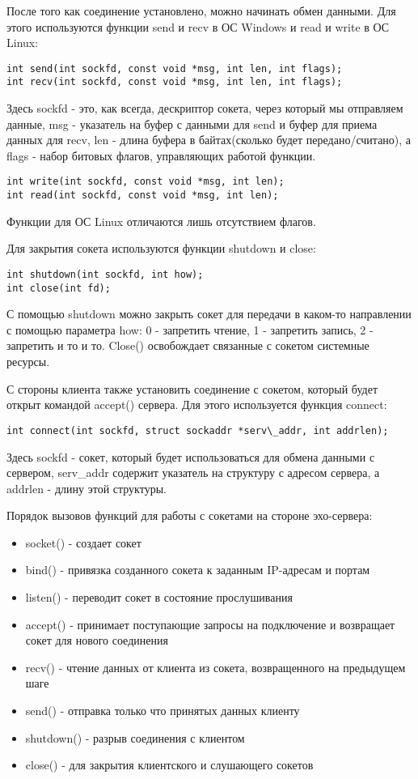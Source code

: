 После того как соединение установлено, можно начинать обмен данными. Для этого используются функции send и recv в ОС Windows и read и write в ОС Linux:
\begin{lstlisting}
int send(int sockfd, const void *msg, int len, int flags);
int recv(int sockfd, const void *msg, int len, int flags);
\end{lstlisting}
Здесь sockfd - это, как всегда, дескриптор сокета, через который мы отправляем данные, msg - указатель на буфер с данными для send и буфер для приема данных для recv, len - длина буфера в байтах(сколько будет передано/считано), а flags - набор битовых флагов, управляющих работой функции.
\begin{lstlisting}
int write(int sockfd, const void *msg, int len);
int read(int sockfd, const void *msg, int len);
\end{lstlisting}
Функции для ОС Linux отличаются лишь отсутствием флагов.

Для закрытия сокета используются функции shutdown и close:
\begin{lstlisting}
int shutdown(int sockfd, int how);
int close(int fd);
\end{lstlisting}
С помощью shutdown можно закрыть сокет для передачи в каком-то направлении с помощью параметра how: 0 - запретить чтение, 1 - запретить запись, 2 - запретить и то и то.
Close() освобождает связанные с сокетом системные ресурсы.

С стороны клиента также установить соединение с сокетом, который будет открыт командой accept() сервера. Для этого используется функция connect:
\begin{lstlisting}
int connect(int sockfd, struct sockaddr *serv\_addr, int addrlen);
\end{lstlisting}
Здесь sockfd - сокет, который будет использоваться для обмена данными с сервером, serv\_addr содержит указатель на структуру с адресом сервера, а addrlen - длину этой структуры.

Порядок вызовов функций для работы с сокетами на стороне эхо-сервера:
\begin{itemize}
\item socket() - создает сокет
\item bind() - привязка созданного сокета к заданным IP-адресам и портам
\item listen() - переводит сокет в состояние прослушивания
\item accept() - принимает поступающие запросы на подключение и возвращает сокет для нового соединения
\item recv() - чтение данных от клиента из сокета, возвращенного на предыдущем шаге
\item send() - отправка только что принятых данных клиенту
\item shutdown() - разрыв соединения с клиентом
\item close() - для закрытия клиентского и слушающего сокетов
\end{itemize}

